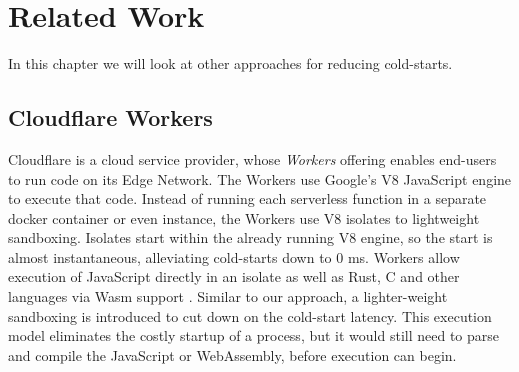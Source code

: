 \chapter{Related Work}

In this chapter we will look at other approaches for reducing cold-starts.

\section{Cloudflare Workers}

Cloudflare is a cloud service provider, whose \emph{Workers} offering enables end-users to run code on its Edge Network. The Workers use Google's V8 JavaScript engine to execute that code.
Instead of running each serverless function in a separate docker container or even  instance, the Workers use V8 isolates to lightweight sandboxing. Isolates start within the already running V8 engine, so the start is almost instantaneous, alleviating cold-starts down to 0 ms.
Workers allow execution of JavaScript directly in an isolate as well as Rust, C and other languages via Wasm support \cite{Cloudflare2021}.
Similar to our approach, a lighter-weight sandboxing is introduced to cut down on the cold-start latency. This execution model eliminates the costly startup of a  process, but it would still need to parse and compile the JavaScript or WebAssembly, before execution can begin.

